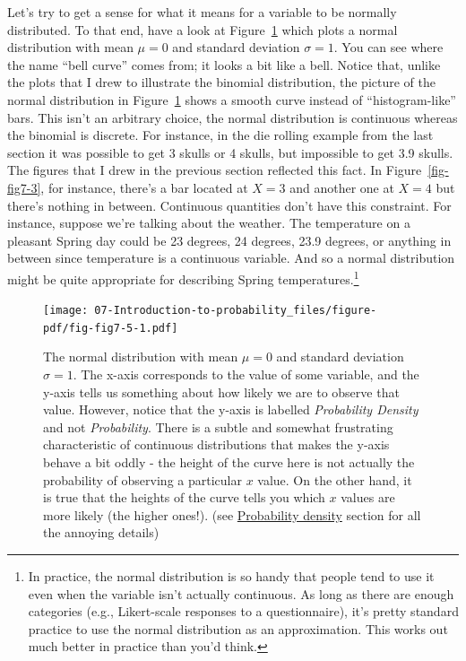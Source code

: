 \documentclass[
  a4paper,
]{book}
\begin{document}
Let's try to get a sense for what it means for a variable to be normally
distributed. To that end, have a look at Figure~\ref{fig-fig7-5} which
plots a normal distribution with mean \(\mu = 0\) and standard deviation
\(\sigma = 1\). You can see where the name ``bell curve'' comes from; it
looks a bit like a bell. Notice that, unlike the plots that I drew to
illustrate the binomial distribution, the picture of the normal
distribution in Figure~\ref{fig-fig7-5} shows a smooth curve instead of
``histogram-like'' bars. This isn't an arbitrary choice, the normal
distribution is continuous whereas the binomial is discrete. For
instance, in the die rolling example from the last section it was
possible to get 3 skulls or 4 skulls, but impossible to get 3.9 skulls.
The figures that I drew in the previous section reflected this fact. In
Figure~\ref{fig-fig7-3}, for instance, there's a bar located at
\(X = 3\) and another one at \(X = 4\) but there's nothing in between.
Continuous quantities don't have this constraint. For instance, suppose
we're talking about the weather. The temperature on a pleasant Spring
day could be 23 degrees, 24 degrees, 23.9 degrees, or anything in
between since temperature is a continuous variable. And so a normal
distribution might be quite appropriate for describing Spring
temperatures.\footnote{In practice, the normal distribution is so handy
  that people tend to use it even when the variable isn't actually
  continuous. As long as there are enough categories (e.g., Likert-scale
  responses to a questionnaire), it's pretty standard practice to use
  the normal distribution as an approximation. This works out much
  better in practice than you'd think.}

\begin{figure}

\texttt{[image: 07-Introduction-to-probability\_files/figure-pdf/fig-fig7-5-1.pdf]} \hfill{}

\caption{\label{fig-fig7-5}The normal distribution with mean \(\mu = 0\)
and standard deviation \(\sigma = 1\). The x-axis corresponds to the
value of some variable, and the y-axis tells us something about how
likely we are to observe that value. However, notice that the y-axis is
labelled \emph{Probability Density} and not \emph{Probability}. There is
a subtle and somewhat frustrating characteristic of continuous
distributions that makes the y-axis behave a bit oddly - the height of
the curve here is not actually the probability of observing a particular
\(x\) value. On the other hand, it is true that the heights of the curve
tells you which \(x\) values are more likely (the higher ones!). (see
\protect\hyperlink{probability-density}{Probability density} section for
all the annoying details)}

\end{figure}
\end{document}
